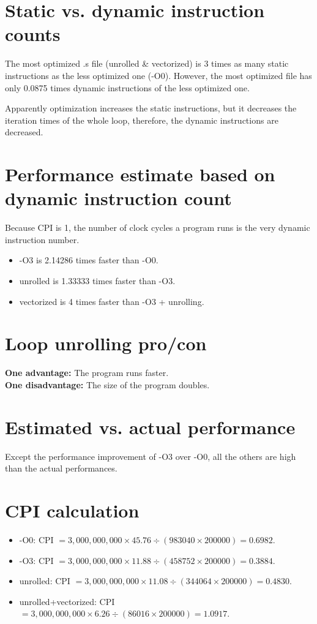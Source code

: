 \documentclass[12pt,letterpaper]{article}
\begin{document}
\section{Static vs. dynamic instruction counts}
The most optimized .s file (unrolled \& vectorized) is 3 times as many
static instructions as the less optimized one (-O0). However, the most
optimized file has only 0.0875 times dynamic instructions of the less
optimized one. 

Apparently optimization increases the static instructions, but it
decreases the iteration times of the whole loop, therefore, the dynamic
instructions are decreased.

\section{Performance estimate based on dynamic instruction count}
Because CPI is 1, the number of clock cycles a program runs is the very
dynamic instruction number.

\begin{itemize}
    \item -O3 is 2.14286 times faster than -O0.
    \item unrolled is 1.33333 times faster than -O3.
    \item vectorized is 4 times faster than -O3 + unrolling.
\end{itemize}

\section{Loop unrolling pro/con}
\textbf{One advantage:} The program runs faster.
\\
\textbf{One disadvantage:} The size of the program doubles.

\section{Estimated vs. actual performance}
Except the performance improvement of -O3 over -O0, all the others
are high than the actual performances.

\section{CPI calculation}
\begin{itemize}
    \item -O0: CPI $=3,000,000,000 \times 45.76 \div (983040 \times
     200000) = 0.6982$.
     \item -O3: CPI $=3,000,000,000 \times 11.88 \div (458752 \times
     200000) = 0.3884$.
     \item unrolled: CPI $=3,000,000,000 \times 11.08 \div (344064
      \times 200000) = 0.4830$.
     \item unrolled+vectorized: CPI $=3,000,000,000 \times 6.26 \div
      (86016 \times 200000) = 1.0917$.
\end{itemize}
\end{document}
